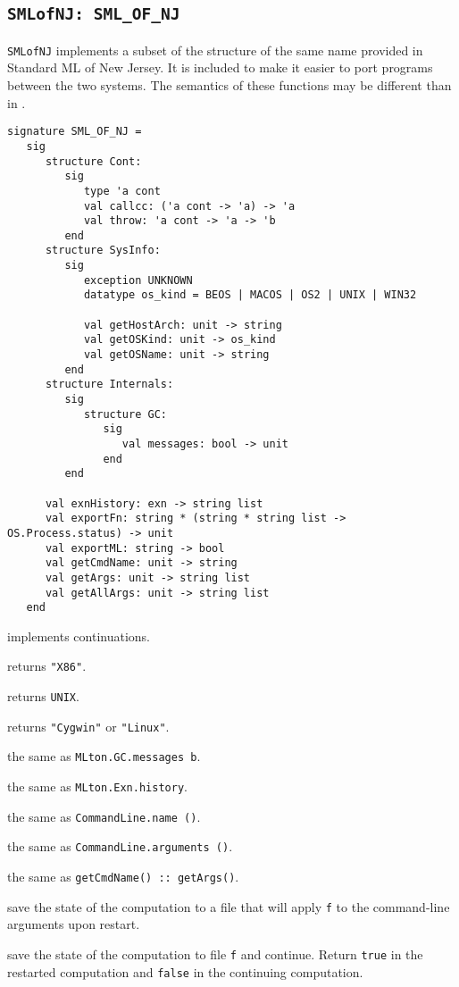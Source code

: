 \subsection{{\tt SMLofNJ: SML\_OF\_NJ}}

{\tt SMLofNJ} implements a subset of the structure of the same name
provided in Standard ML of New Jersey.  It is included to make it
easier to port programs between the two systems.  The semantics of
these functions may be different than in {\smlnj}.

\begin{verbatim}
signature SML_OF_NJ =
   sig
      structure Cont:
         sig
            type 'a cont
            val callcc: ('a cont -> 'a) -> 'a
            val throw: 'a cont -> 'a -> 'b
         end
      structure SysInfo:
         sig
            exception UNKNOWN
            datatype os_kind = BEOS | MACOS | OS2 | UNIX | WIN32

            val getHostArch: unit -> string
            val getOSKind: unit -> os_kind
            val getOSName: unit -> string
         end
      structure Internals:
         sig
            structure GC:
               sig
                  val messages: bool -> unit
               end             
         end

      val exnHistory: exn -> string list
      val exportFn: string * (string * string list -> OS.Process.status) -> unit
      val exportML: string -> bool
      val getCmdName: unit -> string
      val getArgs: unit -> string list
      val getAllArgs: unit -> string list
   end
\end{verbatim}

\begin{description}

 implements continuations.

returns {\tt "X86"}.

returns {\tt UNIX}.

returns {\tt "Cygwin"} or {\tt "Linux"}.

the same as {\tt MLton.GC.messages b}.

the same as {\tt MLton.Exn.history}.

the same as {\tt CommandLine.name ()}.

the same as {\tt CommandLine.arguments ()}.

the same as {\tt getCmdName() :: getArgs()}.

save the state of the computation to a file that will apply {\tt f} to
the command-line arguments upon restart.

save the state of the computation to file {\tt f} and continue.
Return {\tt true} in the restarted computation and {\tt false} in the
continuing computation.

\end{description}

